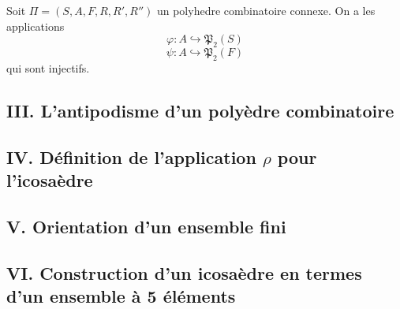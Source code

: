 Soit $\Pi = (S, A, F, R, R', R'')$ un polyhedre combinatoire connexe. On a les applications
$$
\varphi: A \hookrightarrow \mathfrak{P}_2(S)
$$
$$
\psi: A \hookrightarrow \mathfrak{P}_2(F)
$$
qui sont injectifs. 



\subsection*{III. L'antipodisme d'un polyèdre combinatoire}\label{sec:3}%

\subsection*{IV. Définition de l'application $\rho$ pour l'icosaèdre}\label{sec:4}%

\subsection*{V. Orientation d'un ensemble fini}\label{sec:5}%

\subsection*{VI. Construction d'un icosaèdre en termes d'un ensemble à 5 éléments}\label{sec:6}%






